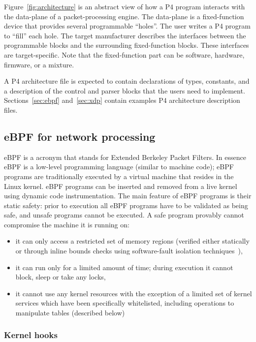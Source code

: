 Figure~\ref{fig:architecture} is an abstract view of how a P4 program
interacts with the data-plane of a packet-processing engine.  The
data-plane is a fixed-function device that provides several
programmable ``holes''.  The user writes a P4 program to ``fill'' each
hole.  The target manufacturer describes the interfaces between the
programmable blocks and the surrounding fixed-function blocks.  These
interfaces are target-specific.  Note that the fixed-function part can
be software, hardware, firmware, or a mixture.

A P4 architecture file is expected to contain declarations of types,
constants, and a description of the control and parser blocks that the
users need to implement.  Sections~\ref{sec:ebpf} and~\ref{sec:xdp}
contain examples P4 architecture description files.

\subsection{eBPF for network processing}

eBPF is a
acronym that stands for Extended Berkeley Packet Filters. In essence
eBPF is a low-level programming language (similar to machine code);
eBPF programs are traditionally executed by a virtual machine that
resides in the Linux kernel. eBPF programs can be inserted and removed
from a live kernel using dynamic code instrumentation. The main
feature of eBPF programs is their static safety: prior to execution
all eBPF programs have to be validated as being safe, and unsafe
programs cannot be executed. A safe program provably cannot compromise
the machine it is running on:
\begin{itemize}
\item it can only access a restricted set of memory regions (verified
  either statically or through inline bounds checks using
  software-fault isolation techniques~\cite{wahbe:93}),
\item it can run only for a limited amount of time; during execution
  it cannot block, sleep or take any locks,
\item it cannot use any kernel resources with the exception of a
  limited set of kernel services which have been specifically
  whitelisted, including operations to manipulate tables (described
  below)
\end{itemize}

\subsubsection{Kernel hooks}

